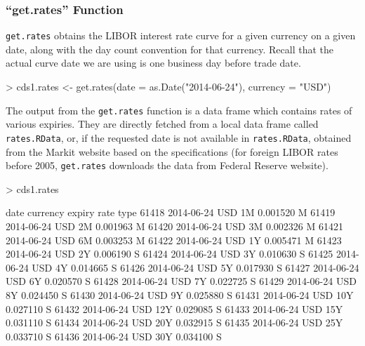 \documentclass{jss}
\begin{document}
\subsubsection{``get.rates'' Function}
\label{sec:get.ratesFunction}

\texttt{get.rates} obtains the LIBOR interest rate curve for a given currency on a given date, along with the day count convention for that currency. Recall that the actual curve date we are using is one business day before trade date. 

\begin{Schunk}
\begin{Sinput}
> cds1.rates <- get.rates(date = as.Date("2014-06-24"), currency = "USD")
\end{Sinput}
\end{Schunk}

The output from the \texttt{get.rates} function is a data frame which contains rates of various expiries. They are directly fetched from a local data frame called \texttt{rates.RData}, or, if the requested date is not available in \texttt{rates.RData}, obtained from the Markit website based on the specifications \citep{rates} (for foreign LIBOR rates before 2005, \texttt{get.rates} downloads the data from Federal Reserve website).

\begin{Schunk}
\begin{Sinput}
> cds1.rates
\end{Sinput}
\begin{Soutput}
            date currency expiry     rate type
61418 2014-06-24      USD     1M 0.001520    M
61419 2014-06-24      USD     2M 0.001963    M
61420 2014-06-24      USD     3M 0.002326    M
61421 2014-06-24      USD     6M 0.003253    M
61422 2014-06-24      USD     1Y 0.005471    M
61423 2014-06-24      USD     2Y 0.006190    S
61424 2014-06-24      USD     3Y 0.010630    S
61425 2014-06-24      USD     4Y 0.014665    S
61426 2014-06-24      USD     5Y 0.017930    S
61427 2014-06-24      USD     6Y 0.020570    S
61428 2014-06-24      USD     7Y 0.022725    S
61429 2014-06-24      USD     8Y 0.024450    S
61430 2014-06-24      USD     9Y 0.025880    S
61431 2014-06-24      USD    10Y 0.027110    S
61432 2014-06-24      USD    12Y 0.029085    S
61433 2014-06-24      USD    15Y 0.031110    S
61434 2014-06-24      USD    20Y 0.032915    S
61435 2014-06-24      USD    25Y 0.033710    S
61436 2014-06-24      USD    30Y 0.034100    S
\end{Soutput}
\end{Schunk}
\end{document}
